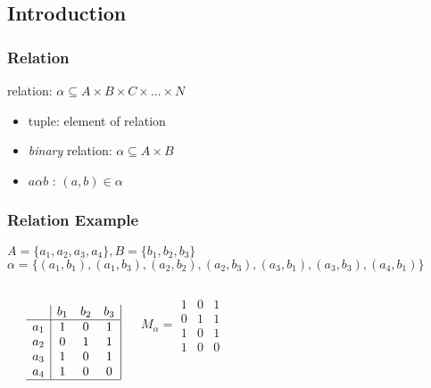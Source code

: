 \documentclass[dvipsnames]{beamer}
\begin{document}
\subsection{Introduction}

\begin{frame}
  \frametitle{Relation}

  \begin{definition}
    \alert{relation}: $\alpha \subseteq A \times B \times C \times \dots \times N$
  \end{definition}

  \begin{itemize}
    \item \alert{tuple}: element of relation
  \end{itemize}

  \pause
  \medskip
  \begin{itemize}
    \item \emph{binary} relation: $\alpha \subseteq A \times B$
    \item $a \alpha b$ \hspace{1em} : \hspace{1em} $(a,b) \in \alpha$
  \end{itemize}
\end{frame}

\begin{frame}
  \frametitle{Relation Example}

  $A=\{a_1,a_2,a_3,a_4\}, B=\{b_1,b_2,b_3\}$\\
  $\alpha = \{(a_1,b_1),(a_1,b_3),(a_2,b_2),(a_2,b_3),
	      (a_3,b_1),(a_3,b_3),(a_4,b_1)\}$

  \pause
  \medskip
  \begin{columns}
    \begin{center}
    \end{center}

    \[
      \begin{array}{c|ccc|}
	    & b_1 & b_2 & b_3\\\hline
	a_1 &  1  &  0  &  1\\
	a_2 &  0  &  1  &  1\\
	a_3 &  1  &  0  &  1\\
	a_4 &  1  &  0  &  0\\\hline
      \end{array}
    \]

    \[
      M_\alpha =
	\begin{array}{|ccc|}
	  1 & 0 & 1\\
	  0 & 1 & 1\\
	  1 & 0 & 1\\
	  1 & 0 & 0
	\end{array}
    \]
  \end{columns}
\end{frame}
\end{document}
